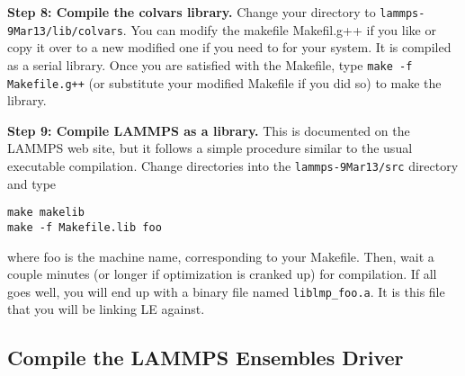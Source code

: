 \documentclass[10pt]{article}
\begin{document}
\textbf{Step 8: Compile the colvars library.}
Change your directory to \texttt{lammps-9Mar13/lib/colvars}. You can modify the
makefile Makefil.g++ if you like or copy it over to a new modified one if you 
need to for your system. It is compiled as a serial library. Once you are satisfied
with the Makefile, type \texttt{make -f Makefile.g++} (or substitute your modified Makefile if
you did so) to make the library.

\textbf{Step 9: Compile LAMMPS as a library.}
This is documented on the LAMMPS web site, but it follows
a simple procedure similar to the usual executable compilation. Change directories into
the \texttt{lammps-9Mar13/src} directory and type
\begin{verbatim}
make makelib
make -f Makefile.lib foo
\end{verbatim}
where foo is the machine name, corresponding to your Makefile. Then, wait a couple minutes
(or longer if optimization is cranked up) for compilation. If all goes well, you will
end up with a binary file named \texttt{liblmp\_foo.a}. It is this file that you will be
linking LE against.

\subsection{Compile the LAMMPS Ensembles Driver}
\end{document}
